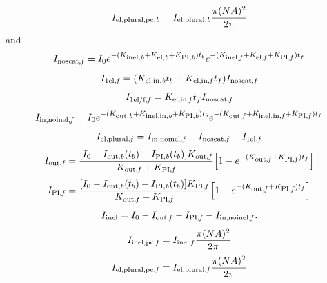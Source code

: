 \documentclass[]{article}
\newcommand\nt{\textup{\scriptsize{0}}}
\newcommand\inel{\textup{\scriptsize{inel}}}
\newcommand\elb{\textup{\scriptsize{el,\textit b}}}
\newcommand\inelb{\textup{\scriptsize{inel,\textit b}}}
\newcommand\elinb{\textup{\scriptsize{el,in,\textit b}}}
\newcommand\inelinb{\textup{\scriptsize{inel,in,\textit b}}}
\newcommand\outb{\textup{\scriptsize{out,\textit b}}}
\newcommand\PIb{\textup{\scriptsize{PI,\textit b}}}
\newcommand\elplb{\textup{\scriptsize{el,plural,\textit b}}}
\newcommand\elplpcb{\textup{\scriptsize{el,plural,pc,\textit b}}}
\newcommand\elf{\textup{\scriptsize{el,\textit f}}}
\newcommand\inelf{\textup{\scriptsize{inel,\textit f}}}
\newcommand\elinf{\textup{\scriptsize{el,in,\textit f}}}
\newcommand\inelinf{\textup{\scriptsize{inel,in,\textit f}}}
\newcommand\outf{\textup{\scriptsize{out,\textit f}}}
\newcommand\PIf{\textup{\scriptsize{PI,\textit f}}}
\newcommand\noscatf{\textup{\scriptsize{noscat,\textit f}}}
\newcommand\self{\textup{\scriptsize{1el,\textit f}}}
\newcommand\selff{\textup{\scriptsize{1el/f,\textit f}}}
\newcommand\elplf{\textup{\scriptsize{el,plural,\textit f}}}
\newcommand\innoinelf{\textup{\scriptsize{in,noinel,\textit f}}}
\newcommand\inelpcf{\textup{\scriptsize{inel,pc,\textit f}}}
\newcommand\elplpcf{\textup{\scriptsize{el,plural,pc,\textit f}}}
\begin{document}
\begin{equation}
I_{\elplpcb} = I_{\elplb} \frac{\pi(NA)^2}{2\pi}
\end{equation} %
and
\begin{equation}
I_{\noscatf} = I_{\nt}e^{-(K_{\inelb}+K_{\elb}+K_{\PIb})t_b}e^{-(K_{\inelf}+K_{\elf}+K_{\PIf})t_f}
\label{xf1}
\end{equation} %
\begin{equation}
I_{\self} = (K_{\elinb}t_b + K_{\elinf}t_f) I_{\noscatf}
\label{xf2}
\end{equation} %
\begin{equation}
I_{\selff} = K_{\elinf}t_f I_{\noscatf}
\label{xf2.5}
\end{equation} %
\begin{equation}
I_{\innoinelf} = I_{\nt} e^{-(K_{\outb}+K_{\inelinb}+K_{\PIb})t_b} e^{-(K_{\outf}+K_{\inelinf}+K_{\PIf})t_f}
\label{xf3}
\end{equation} %
\begin{equation}
I_{\elplf} = I_{\innoinelf} - I_{\noscatf} - I_{\self}
\label{xf4}
\end{equation} %
\begin{equation}
I_{\outf} = \frac{[I_{\nt}-I_{\outb}(t_b)-I_{\PIb}(t_b)]K_{\outf}}{K_{\outf}+K_{\PIf}} \Big[1 - e^{-(K_{\outf}+K_{\PIf})t_f}\Big]
\label{xf5}
\end{equation} %
\begin{equation}
I_{\PIf} = \frac{[I_{\nt}-I_{\outb}(t_b)-I_{\PIb}(t_b)]K_{\PIf}}{K_{\outf}+K_{\PIf}} \Big[1 - e^{-(K_{\outf}+K_{\PIf})t_f}\Big]
\label{xf6}
\end{equation} %
\begin{equation}
I_{\inel} = I_{\nt} - I_{\outf} - I_{\PIf} - I_{\innoinelf}.
\label{xf7}
\end{equation} %
\begin{equation}
I_{\inelpcf} = I_{\inelf} \frac{\pi(NA)^2}{2\pi}
\end{equation} %
\begin{equation}
I_{\elplpcf} = I_{\elplf} \frac{\pi(NA)^2}{2\pi}
\end{equation} %
 
\end{document}

